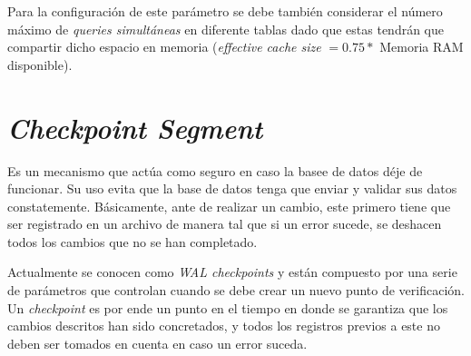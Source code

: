 \documentclass[12pt,conference]{IEEEtran}
\begin{document}
Para la configuración de este parámetro se debe también considerar el número máximo de \textit{queries simultáneas} en diferente tablas dado que estas tendrán que compartir dicho espacio en memoria (\textit{effective cache size} $= 0.75 * $ Memoria RAM disponible).

\section{\textit{Checkpoint Segment}}

Es un mecanismo que actúa como seguro en caso la basee de datos déje de funcionar. Su uso evita que la base de datos tenga que enviar y validar sus datos constatemente. Básicamente, ante de realizar un cambio, este primero tiene que ser registrado en un archivo de manera tal que si un error sucede, se  deshacen todos los cambios que no se han completado.

Actualmente se conocen como \textit{WAL checkpoints} y están compuesto por una serie de parámetros que controlan cuando se debe crear un nuevo punto de verificación. Un \textit{checkpoint} es por ende un punto en el tiempo en donde se garantiza que los cambios descritos han sido concretados, y todos los registros previos a este no deben ser tomados en cuenta en caso un error suceda. 
\end{document}
